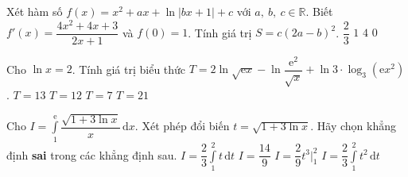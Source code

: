 \begin{ex}%
	Xét hàm số $f(x)=x^2+ax+\ln \left|bx+1\right|+c$ với $a,\ b,\ c\in \mathbb{R}$. Biết $f'(x)=\dfrac{4x^2+4x+3}{2x+1}$ và $f(0)=1$. Tính giá trị $S=c(2a-b)^2$.
	\choice
	{$\dfrac{2}{3}$}
	{$1$}
	{$4$}
	{\True $0$}
\end{ex}
\begin{ex}%
	Cho $\ln x=2$. Tính giá trị biểu thức $T=2\ln \sqrt{\mathrm{e}x}-\ln \dfrac{\mathrm{e}^2}{\sqrt{x}}+\ln 3\cdot\log _3(\mathrm{e}x^2)$.
	\choice
	{$T=13$}
	{$T=12$}
	{\True $T=7$}
	{$T=21$}
\end{ex}
\begin{ex}%
	Cho $I=\displaystyle\int\limits_1^\mathrm{e} \dfrac{\sqrt{1+3\ln x}}{x} \mathrm{\,d}x$. Xét phép đổi biến $t=\sqrt{1+3\ln x}$. Hãy chọn khẳng định \textbf{sai} trong các khẳng định sau.
	\choice
	{\True $I=\dfrac{2}{3}\displaystyle\int\limits_1^2 t \mathrm{\,d}t$}
	{$I=\dfrac{14}{9}$}
	{$I=\dfrac{2}{9}t^3\bigg|_1^2$}
	{$I=\dfrac{2}{3}\displaystyle\int\limits_1^2 t^2 \mathrm{\,d}t$}
\end{ex}

